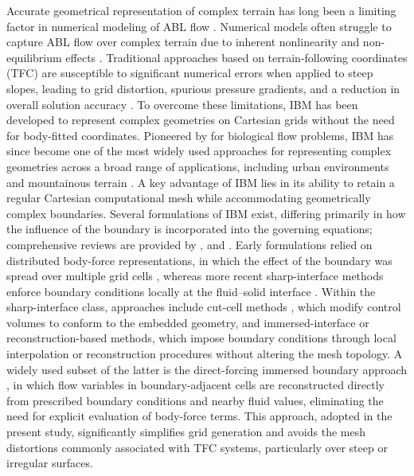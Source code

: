 \documentclass[%
superscriptaddress,
 amsmath,amssymb,
pra,
showkeys,
]{revtex4-2}
\begin{document}
Accurate geometrical representation of complex terrain has long been a limiting factor in numerical modeling of ABL flow \cite{bao2018large,giani2024sensitivity}. Numerical models often struggle to capture ABL flow over complex terrain due to inherent nonlinearity and non-equilibrium effects \cite{uchida2003large,wan2007evaluation,cao2012numerical,yang2021study}.
Traditional approaches based on terrain-following coordinates (TFC) \cite{clark1977small,schar2002new} are susceptible to significant numerical errors when applied to steep slopes, leading to grid distortion, spurious pressure gradients, and a reduction in overall solution accuracy \cite{giani2024sensitivity}. To overcome these limitations, IBM has been developed to represent complex geometries on Cartesian grids without the need for body-fitted coordinates. Pioneered by \citet{peskin1972flow} for biological flow problems, IBM has since become one of the most widely used approaches for representing complex geometries across a broad range of applications, including urban environments and mountainous terrain \cite{tseng2006modeling,diebold2013flow,bou2009effects,lundquist2010immersed,lundquist2012immersed,bao2018large,alam2018large}. A key advantage of IBM lies in its ability to retain a regular Cartesian computational mesh while accommodating geometrically complex boundaries. Several formulations of IBM exist, differing primarily in how the influence of the boundary is incorporated into the governing equations; comprehensive reviews are provided by \citet{iaccarino2003immersed}, and \citet{mittal2005immersed}. Early formulations relied on distributed body-force representations, in which the effect of the boundary was spread over multiple grid cells \cite{Peskin2002}, whereas more recent sharp-interface methods enforce boundary conditions locally at the fluid–solid interface \cite{mohd1997combined,fadlun2000combined,gilmanov2005hybrid}. Within the sharp-interface class, approaches include cut-cell methods \cite{Meyer2010,Kirkpatrick2003}, which modify control volumes to conform to the embedded geometry, and immersed-interface or reconstruction-based methods, which impose boundary conditions through local interpolation or reconstruction procedures without altering the mesh topology. A widely used subset of the latter is the direct-forcing immersed boundary approach \cite{Deleon2018,gilmanov2005hybrid}, in which flow variables in boundary-adjacent cells are reconstructed directly from prescribed boundary conditions and nearby fluid values, eliminating the need for explicit evaluation of body-force terms. This approach, adopted in the present study, significantly simplifies grid generation and avoids the mesh distortions commonly associated with TFC systems, particularly over steep or irregular surfaces.
\end{document}
